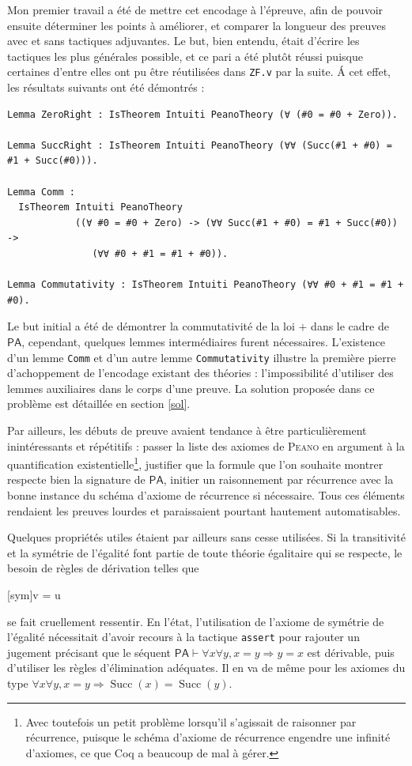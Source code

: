 \documentclass[a4paper]{article}
\DeclareMathOperator{\Succ}{\mathrm{Succ}}
\newcommand{\PA}{\mathsf{PA}}
\theoremstyle{remark}
\theoremstyle{remark}
\theoremstyle{remark}
\theoremstyle{definition}
\theoremstyle{definition}
\theoremstyle{definition}
\begin{document}
Mon premier travail a été de mettre cet encodage à l'épreuve, afin de pouvoir ensuite déterminer les points à améliorer, et comparer la longueur des preuves avec et sans tactiques adjuvantes. Le but, bien entendu, était d'écrire les tactiques les plus générales possible, et ce pari a été plutôt réussi puisque certaines d'entre elles ont pu être réutilisées dans \verb+ZF.v+ par la suite. \'A cet effet, les résultats suivants ont été démontrés :
\begin{verbatim}
Lemma ZeroRight : IsTheorem Intuiti PeanoTheory (∀ (#0 = #0 + Zero)).

Lemma SuccRight : IsTheorem Intuiti PeanoTheory (∀∀ (Succ(#1 + #0) = #1 + Succ(#0))).

Lemma Comm :
  IsTheorem Intuiti PeanoTheory
            ((∀ #0 = #0 + Zero) -> (∀∀ Succ(#1 + #0) = #1 + Succ(#0)) ->
               (∀∀ #0 + #1 = #1 + #0)).

Lemma Commutativity : IsTheorem Intuiti PeanoTheory (∀∀ #0 + #1 = #1 + #0).
\end{verbatim}
Le but initial a été de démontrer la commutativité de la loi $+$ dans le cadre de $\PA$, cependant, quelques lemmes intermédiaires furent nécessaires. L'existence d'un lemme \verb+Comm+ et d'un autre lemme \verb+Commutativity+ illustre la première pierre d'achoppement de l'encodage existant des théories : l'impossibilité d'utiliser des lemmes auxiliaires dans le corps d'une preuve. La solution proposée dans ce problème est détaillée en section \ref{sol}.

Par ailleurs, les débuts de preuve avaient tendance à être particulièrement inintéressants et répétitifs : passer la liste des axiomes de \textsc{Peano} en argument à la quantification existentielle\footnote{Avec toutefois un petit problème lorsqu'il s'agissait de raisonner par récurrence, puisque le schéma d'axiome de récurrence engendre une infinité d'axiomes, ce que Coq a beaucoup de mal à gérer.}, justifier que la formule que l'on souhaite montrer respecte bien la signature de $\PA$, initier un raisonnement par récurrence avec la bonne instance du schéma d'axiome de récurrence si nécessaire. Tous ces éléments rendaient les preuves lourdes et paraissaient pourtant hautement automatisables.

Quelques propriétés utiles étaient par ailleurs sans cesse utilisées. Si la transitivité et la symétrie de l'égalité font partie de toute théorie égalitaire qui se respecte, le besoin de règles de dérivation telles que \begin{prooftree*}
[sym]{\Gamma \vdash v = u}
\end{prooftree*} se fait cruellement ressentir. En l'état, l'utilisation de l'axiome de symétrie de l'égalité nécessitait d'avoir recours à la tactique \verb+assert+ pour rajouter un jugement précisant que le séquent $\PA \vdash \forall x \forall y, x = y \Rightarrow y = x$ est dérivable, puis d'utiliser les règles d'élimination adéquates. Il en va de même pour les axiomes du type $\forall x \forall y, x = y \Rightarrow \Succ (x) = \Succ (y)$.
\end{document}
